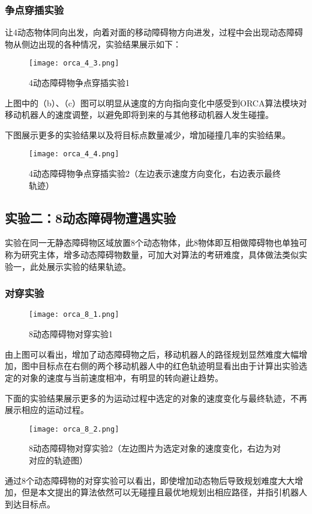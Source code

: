 \subsubsection{争点穿插实验}
让4动态物体同向出发，向着对面的移动障碍物方向进发，过程中会出现动态障碍物从侧边出现的各种情况，实验结果展示如下：

\begin{figure}[ht]
    \centering
    \texttt{[image: orca\_4\_3.png]}
    \caption{4动态障碍物争点穿插实验1}
\end{figure}

上图中的（b）、（c）图可以明显从速度的方向指向变化中感受到ORCA算法模块对移动机器人的速度调整，以避免即将到来的与其他移动机器人发生碰撞。

下图展示更多的实验结果以及将目标点数量减少，增加碰撞几率的实验结果。
\begin{figure}[ht]
    \centering
    \texttt{[image: orca\_4\_4.png]}
    \caption{4动态障碍物争点穿插实验2（左边表示速度方向变化，右边表示最终轨迹）}
\end{figure}



\subsection{实验二：8动态障碍物遭遇实验}
实验在同一无静态障碍物区域放置8个动态物体，此8物体即互相做障碍物也单独可称为研究主体，增多动态障碍物数量，可加大对算法的考研难度，具体做法类似实验一，此处展示实验的结果轨迹。

\subsubsection{对穿实验}
\begin{figure}[ht]
    \centering
    \texttt{[image: orca\_8\_1.png]}
    \caption{8动态障碍物对穿实验1}
\end{figure}
由上图可以看出，增加了动态障碍物之后，移动机器人的路径规划显然难度大幅增加，图中目标点在右侧的两个移动机器人中的红色轨迹明显看出由于计算出实验选定的对象的速度与当前速度相冲，有明显的转向避让趋势。

下面的实验结果展示更多的为运动过程中选定的对象的速度变化与最终轨迹，不再展示相应的运动过程。
\begin{figure}[ht]
    \centering
    \texttt{[image: orca\_8\_2.png]}
    \caption{8动态障碍物对穿实验2（左边图片为选定对象的速度变化，右边为对对应的轨迹图）}
\end{figure}
通过8个动态障碍物的对穿实验可以看出，即使增加动态物后导致规划难度大大增加，但是本文提出的算法依然可以无碰撞且最优地规划出相应路径，并指引机器人到达目标点。


